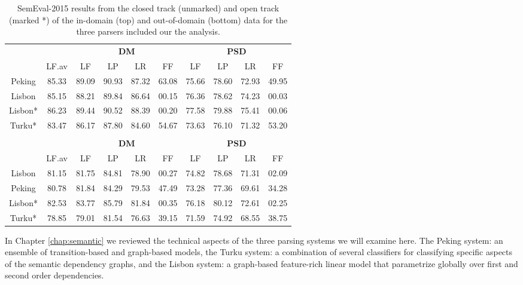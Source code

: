 \begin{table}
    \centering
    \begin{tabular}{@{}cccccccccc@{}}
        \toprule
        \multicolumn{1}{c}{ }
        & \multicolumn{1}{c}{ }
        & \multicolumn{4}{c}{\textbf{DM}}
        & \multicolumn{4}{c}{\textbf{PSD}} \\
        \cmidrule(lr){3-6}
        \cmidrule(lr){7-10}
        &
        LF.av &
        LF & LP & LR & FF &
        LF & LP & LR & FF \\
        \midrule
        Peking & 85.33 & 89.09 & 90.93 & 87.32 & 63.08 & 75.66 & 78.60 & 72.93 & 49.95 \\
        Lisbon & 85.15 & 88.21 & 89.84 & 86.64 & 00.15 & 76.36 & 78.62 & 74.23 & 00.03 \\
        \midrule
        Lisbon* & 86.23 & 89.44 & 90.52 & 88.39 & 00.20 & 77.58 & 79.88 & 75.41 & 00.06 \\
        Turku* & 83.47 & 86.17 & 87.80 & 84.60 & 54.67 & 73.63 & 76.10 & 71.32 & 53.20 \\
        \bottomrule
        
        \\
        \toprule
        \multicolumn{1}{c}{ }
        & \multicolumn{1}{c}{ }
        & \multicolumn{4}{c}{\textbf{DM}}
        & \multicolumn{4}{c}{\textbf{PSD}} \\
        \cmidrule(lr){3-6}
        \cmidrule(lr){7-10}
        &
        LF.av &
        LF & LP & LR & FF &
        LF & LP & LR & FF \\
        \midrule
        Lisbon & 81.15 & 81.75 & 84.81 & 78.90 & 00.27 & 74.82 & 78.68 & 71.31 & 02.09 \\
        Peking & 80.78 & 81.84 & 84.29 & 79.53 & 47.49 & 73.28 & 77.36 & 69.61 & 34.28 \\
        \midrule
        Lisbon* & 82.53 & 83.77 & 85.79 & 81.84 & 00.35 & 76.18 & 80.12 & 72.61 & 02.25 \\
        Turku* & 78.85 & 79.01 & 81.54 & 76.63 & 39.15 & 71.59 & 74.92 & 68.55 & 38.75 \\
        \bottomrule
    \end{tabular}
    \caption{SemEval-2015 results from the closed track (unmarked) and open track (marked *) of the in-domain (top) and out-of-domain (bottom) data for the three parsers included our the analysis.}
    \label{fig:data:recap}
\end{table}

In Chapter \ref{chap:semantic} we reviewed the technical aspects of the three parsing systems we will examine here. The Peking system: an ensemble of transition-based and graph-based models, the Turku system: a combination of several classifiers for classifying specific aspects of the semantic dependency graphs, and the Lisbon system: a graph-based feature-rich linear model that parametrize globally over first and second order dependencies.

